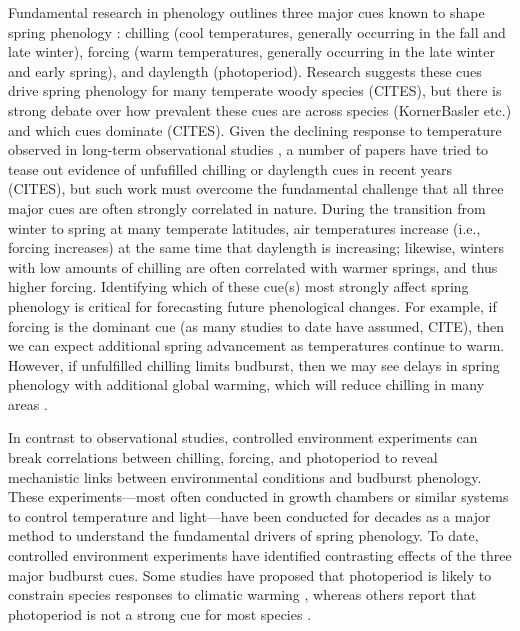 \documentclass[11pt,letter]{article}
\begin{document}
\par Fundamental research in phenology outlines three major cues known to shape spring phenology \citep{chuineJTB}: chilling (cool temperatures, generally occurring in the fall and late winter), forcing (warm temperatures, generally occurring in the late winter and early spring), and daylength (photoperiod). Research suggests these cues drive spring phenology for many temperate woody species (CITES), but there is strong debate over how prevalent these cues are across species (KornerBasler etc.) and which cues dominate (CITES). Given the declining response to temperature observed in long-term observational studies \citep{fu2015}, a number of papers have tried to tease out evidence of unfufilled chilling or daylength cues in recent years (CITES), but such work must overcome the fundamental challenge that all three major cues are often strongly correlated in nature. During the transition from winter to spring at many temperate latitudes, air temperatures increase (i.e., forcing increases) at the same time that daylength is increasing; likewise, winters with low amounts of chilling are often correlated with warmer springs, and thus higher forcing.  Identifying which of these cue(s) most strongly affect spring phenology is critical for forecasting future phenological changes. For example, if forcing is the dominant cue (as many studies to date have assumed, CITE), then we can expect additional spring advancement as temperatures continue to warm. However, if unfulfilled chilling limits budburst, then we may see delays in spring phenology with additional global warming, which will reduce chilling in many areas \citep{fraga2019}. %

\par In contrast to observational studies, controlled environment experiments can break correlations between chilling, forcing, and photoperiod to reveal mechanistic links between environmental conditions and budburst phenology. These experiments---most often conducted in growth chambers or similar systems to control temperature and light---have been conducted for decades as a major method to understand the fundamental drivers of spring phenology. To date, controlled environment experiments have identified contrasting effects of the three major budburst cues. Some studies have proposed that photoperiod is likely to constrain species responses to climatic warming \citep{Basler:2012, Caffarra:2011b,Caffarra:2011a}, whereas others report that photoperiod is not a strong cue for most species \citep{zohner2016,Laube:2014a}. 
\end{document}
